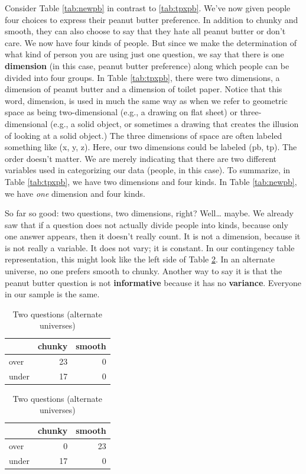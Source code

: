 \documentclass[
  openany]{book}
\begin{document}
Consider Table \ref{tab:newpb} in contrast to \ref{tab:tpxpb}. We've now given people four choices to express their peanut butter preference. In addition to chunky and smooth, they can also choose to say that they hate all peanut butter or don't care. We now have four kinds of people. But since we make the determination of what kind of person you are using just one question, we say that there is one \textbf{dimension} (in this case, peanut butter preference) along which people can be divided into four groups. In Table \ref{tab:tpxpb}, there were two dimensions, a dimension of peanut butter and a dimension of toilet paper. Notice that this word, dimension, is used in much the same way as when we refer to geometric space as being two-dimensional (e.g., a drawing on flat sheet) or three-dimensional (e.g., a solid object, or sometimes a drawing that creates the illusion of looking at a solid object.) The three dimensions of space are often labeled something like (x, y, z). Here, our two dimensions could be labeled (pb, tp). The order doesn't matter. We are merely indicating that there are two different variables used in categorizing our data (people, in this case). To summarize, in Table \ref{tab:tpxpb}, we have two dimensions and four kinds. In Table \ref{tab:newpb}, we have \emph{one} dimension and four kinds.

So far so good: two questions, two dimensions, right? Well\ldots{} maybe. We already saw that if a question does not actually divide people into kinds, because only one answer appears, then it doesn't really count. It is not a dimension, because it is not really a variable. It does not vary; it is constant. In our contingency table representation, this might look like the left side of Table \ref{tab:tpxpb-alt}. In an alternate universe, no one prefers smooth to chunky. Another way to say it is that the peanut butter question is not \textbf{informative} because it has no \textbf{variance}. Everyone in our sample is the same.

\begin{table}[!h]
\caption{\label{tab:tpxpb-alt}Two questions (alternate universes)}

\centering
\begin{tabular}[t]{lrr}
\toprule
  & chunky & smooth\\
\midrule
over & 23 & 0\\
under & 17 & 0\\
\bottomrule
\end{tabular}
\centering
\begin{tabular}[t]{lrr}
\toprule
  & chunky & smooth\\
\midrule
over & 0 & 23\\
under & 17 & 0\\
\bottomrule
\end{tabular}
\end{table}
\end{document}
